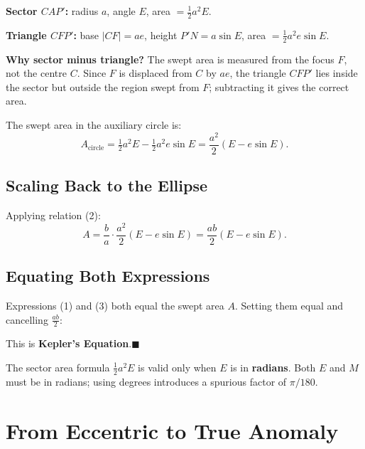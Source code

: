 \documentclass[12pt]{article}
\newenvironment{keyeq}{%
  \begin{tcolorbox}[
    enhanced, colback=blue!4!white, colframe=deepblue,
    boxrule=0.8pt, arc=4pt
  ]\centering
}{\end{tcolorbox}}
\newenvironment{notebox}[1]{%
  \begin{tcolorbox}[
    enhanced, breakable,
    colback=blue!3!white, colframe=deepblue,
    boxrule=0.7pt, arc=4pt,
    title={\bfseries #1}
  ]
}{\end{tcolorbox}}
\begin{document}
\vspace{0.3cm}
\noindent
\textbf{Sector $CAP'$:} radius $a$, angle $E$, area $= \tfrac{1}{2}a^2 E$.

\noindent
\textbf{Triangle $CFP'$:} base $|CF| = ae$, height $P'N = a\sin E$,
area $= \tfrac{1}{2}a^2 e\sin E$.

\noindent
\textbf{Why sector minus triangle?}  The swept area is measured from the focus $F$,
not the centre $C$. Since $F$ is displaced from $C$ by $ae$, the triangle $CFP'$
lies inside the sector but outside the region swept from $F$; subtracting it gives
the correct area.

\noindent The swept area in the auxiliary circle is:
\[
  A_{\text{circle}} = \tfrac{1}{2}a^2 E - \tfrac{1}{2}a^2 e\sin E
                    = \frac{a^2}{2}(E - e\sin E).
\]

\subsection{Scaling Back to the Ellipse}

Applying relation (2):
\[
  A = \frac{b}{a} \cdot \frac{a^2}{2}(E - e\sin E)
    = \frac{ab}{2}(E - e\sin E). \tag{3}
\]
\newpage
\subsection{Equating Both Expressions}

Expressions (1) and (3) both equal the swept area $A$. Setting them equal and
cancelling $\tfrac{ab}{2}$:

\vspace{-0.4cm}
\begin{keyeq}
\end{keyeq}
\vspace{0.2cm}
\noindent

This is \textbf{Kepler's Equation}.\hfill$\blacksquare$

\vspace{0.4cm}
\begin{notebox}{Important: Angles Must Be in Radians}
The sector area formula $\tfrac{1}{2}a^2 E$ is valid only when $E$ is in
\textbf{radians}. Both $E$ and $M$ must be in radians; using degrees introduces
a spurious factor of $\pi/180$.
\end{notebox}

\section{From Eccentric to True Anomaly}
\end{document}

